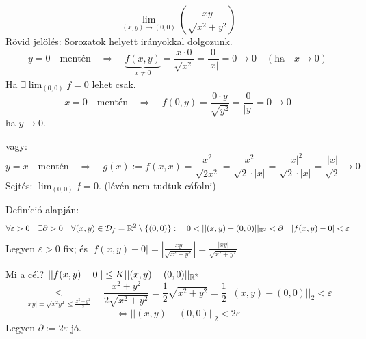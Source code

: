 \documentclass[a4paper,11.5pt]{article}
\begin{document}
	\begin{task}
		\[ \lim_{(x,y)\to(0,0)}\left(\frac{xy}{\sqrt{x^2+y^2}}\right) \]
		Rövid jelölés: Sorozatok helyett irányokkal dolgozunk.
		\[ y=0\quad \text{mentén}\quad \Rightarrow\quad \underbrace{f(x,y)}_{x\not=0}=\frac{x\cdot0}{\sqrt{x^2}}=\frac{0}{|x|}=0\to0\quad (\text{ha}\quad x\to0) \]
		Ha $\exists\lim_{(0,0)}f=0$ lehet csak.
		\[ x=0\quad \text{mentén}\quad \Rightarrow\quad f(0,y)=\frac{0\cdot y}{\sqrt{y^2}}=\frac{0}{|y|}=0\to 0 \]
		ha $y\to0$.
		
		\smallskip
		vagy:
		\[ y=x\quad \text{mentén}\quad \Rightarrow\quad g(x):=f(x,x)=\frac{x^2}{\sqrt{2x^2}}=\frac{x^2}{\sqrt{2}\cdot|x|}=\frac{|x|^2}{\sqrt{2}\cdot|x|}=\frac{|x|}{\sqrt{2}}\to0 \]
		Sejtés: $\lim_{(0,0)}f=0$. (lévén nem tudtuk cáfolni)
		
		Definíció alapján:
		\[ \forall\varepsilon>0\quad \exists\partial>0\quad \forall(x,y)\in\mathcal{D}_f=\R^2\setminus\{(0,0)\}:\quad 0<||(x,y)-(0,0)||_{\R^2}<\partial\quad |f(x,y)-0|<\varepsilon \]
		Legyen $\varepsilon>0$ fix; és $|f(x,y)-0|=\left|\frac{xy}{\sqrt{x^2+y^2}}\right|=\frac{|xy|}{\sqrt{x^2+y^2}}$
		
		Mi a cél? $||f(x,y)-0||\leq K||(x,y)-(0,0)||_{\mathbb{R}{^2}}$
		\[ \underset{|xy|=\sqrt{x^2y^2}\leq\frac{x^2+y^2}{2}}{\leq}\quad\frac{x^2+y^2}{2\sqrt{x^2+y^2}}=\frac{1}{2}\sqrt{x^2+y^2}=\frac{1}{2}||(x,y)-(0,0)||_2<\varepsilon  \]
		\[ \Leftrightarrow||(x,y)-(0,0)||_2<2\varepsilon \]
		Legyen $\partial:=2\varepsilon$ jó.
	\end{task}
\end{document}
